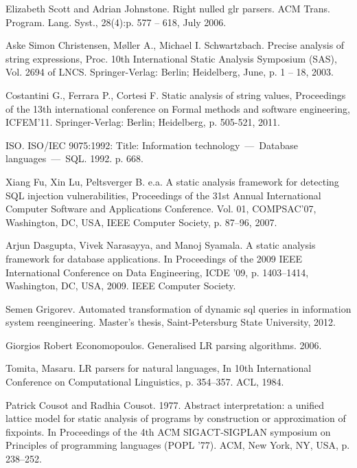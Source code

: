 \documentclass{sigplanconf}
\begin{document}
\begin{thebibliography}{}
Elizabeth Scott and Adrian Johnstone. Right nulled glr parsers. ACM Trans. Program. Lang. Syst., 28(4):p. 577 -- 618, July 2006.

Aske Simon Christensen, M{\o}ller A., Michael I. Schwartzbach. Precise analysis of string expressions, Proc. 10th International Static Analysis Symposium (SAS), Vol. 2694 of LNCS. Springer-Verlag: Berlin; Heidelberg, June, p. 1 -- 18, 2003.

\balance

Costantini G., Ferrara P., Cortesi F. Static analysis of string values, Proceedings of the 13th international conference on Formal methods and software engineering, ICFEM’11. Springer-Verlag: Berlin; Heidelberg, p. 505-521, 2011.


ISO. ISO/IEC 9075:1992: Title: Information technology~---~Database languages~---~SQL. 1992. p. 668.

Xiang Fu, Xin Lu, Peltsverger B. e.a. A static analysis framework for detecting SQL injection vulnerabilities, Proceedings of the 31st Annual International Computer Software and Applications Conference. Vol. 01, COMPSAC’07, Washington, DC, USA, IEEE Computer Society, p. 87--96, 2007.

Arjun Dasgupta, Vivek Narasayya, and Manoj Syamala. A static analysis framework for database applications. In Proceedings of the 2009 IEEE International Conference on Data Engineering, ICDE '09, p. 1403--1414, Washington, DC, USA, 2009. IEEE Computer Society.

Semen Grigorev. Automated transformation of dynamic sql queries in information system reengineering. Master's thesis, Saint-Petersburg State University, 2012.

 Giorgios Robert Economopoulos. Generalised LR parsing algorithms. 2006.
 
 Tomita, Masaru. LR parsers for natural languages, In 10th International Conference on Computational Linguistics, p. 354--357. ACL, 1984.

 Patrick Cousot and Radhia Cousot. 1977. Abstract interpretation: a unified lattice model for static analysis of programs by construction or approximation of fixpoints. In Proceedings of the 4th ACM SIGACT-SIGPLAN symposium on Principles of programming languages (POPL '77). ACM, New York, NY, USA, p. 238--252.
 

\end{thebibliography}
\end{document}
